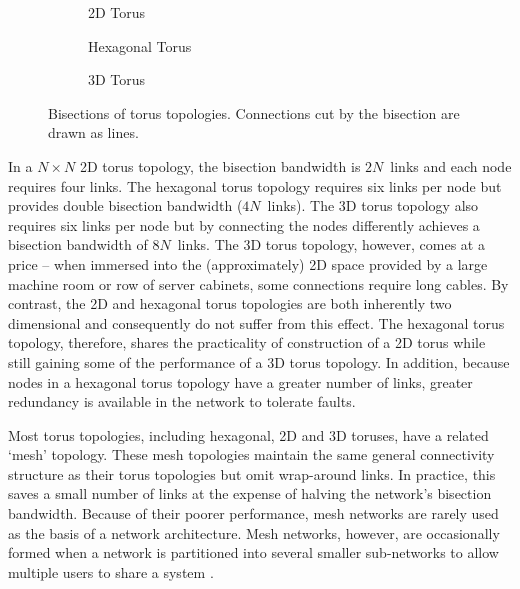 		\begin{figure}
			\center
			\begin{subfigure}[b]{0.3\linewidth}
				\center
				
				\caption{2D Torus}
				\label{fig:bisection-bandwidth-2d}
			\end{subfigure}
			\begin{subfigure}[b]{0.3\linewidth}
				\center
				
				\caption{Hexagonal Torus}
				\label{fig:bisection-bandwidth-hex}
			\end{subfigure}
			\begin{subfigure}[b]{0.3\linewidth}
				\center
				
				\caption{3D Torus}
				\label{fig:bisection-bandwidth-3d}
			\end{subfigure}
			
			\caption[Bisections of torus topologies.]%
			{Bisections of torus topologies. Connections cut by the bisection
			are drawn as lines.}
			\label{fig:bisection-bandwidth}
		\end{figure}
		
		In a $N \times N$ 2D torus topology, the bisection bandwidth is $2N$~links
		and each node requires four links. The hexagonal torus topology requires
		six links per node but provides double bisection bandwidth ($4N$~links).
		The 3D torus topology also requires six links per node but by connecting
		the nodes differently achieves a bisection bandwidth of $8N$~links.  The 3D
		torus topology, however, comes at a price -- when immersed into the
		(approximately) 2D space provided by a large machine room or row of server
		cabinets, some connections require long cables. By contrast, the 2D and
		hexagonal torus topologies are both inherently two dimensional and
		consequently do not suffer from this effect. The hexagonal torus topology,
		therefore, shares the practicality of construction of a 2D torus while
		still gaining some of the performance of a 3D torus topology. In addition,
		because nodes in a hexagonal torus topology have a greater number of links,
		greater redundancy is available in the network to tolerate faults.
		
		Most torus topologies, including hexagonal, 2D and 3D toruses, have a
		related `mesh' topology. These mesh topologies maintain the same general
		connectivity structure as their torus topologies but omit wrap-around
		links. In practice, this saves a small number of links at the expense of
		halving the network's bisection bandwidth.  Because of their poorer
		performance, mesh networks are rarely used as the basis of a network
		architecture. Mesh networks, however, are occasionally formed when a
		network is partitioned into several smaller sub-networks to allow multiple
		users to share a system \cite{spalloc16}.
		
